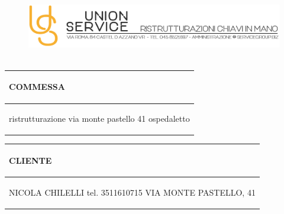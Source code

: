 \documentclass[a4paper]{article}
\begin{document}
    
                          \begin{figure}[!t]
                          \includegraphics[width=15.8cm, height=3cm]{intestazioneAlta2.jpg}
                          \end{figure}
    
                          \noindent\begin{tabular}{| L{72.2mm} |}
                              \hline
                              \vspace{2.5mm}
                              \begin{spacing}{0}
                              \textbf{COMMESSA}
                              \end{spacing}\\
                              \hline
                              \vspace{4mm}
                              \begin{spacing}{1.2}
    
                          ristrutturazione \newline via monte pastello 41 \newline ospedaletto
                            \end{spacing}\\
                              \hline
                            \end{tabular}
                            \quad
                            \begin{tabular}{ | R{72.2mm} | }
                              \hline
                              \vspace{2.5mm}
                              \begin{spacing}{0}
                              \textbf{CLIENTE}
                              \end{spacing}\\
                              \hline
                              \vspace{4mm}
                              \begin{spacing}{1.2}
    
                         NICOLA CHILELLI \newline tel. 3511610715 \newline VIA MONTE PASTELLO, 41
                            \end{spacing}\\
                              \hline
                            \end{tabular}
    
\end{document}

